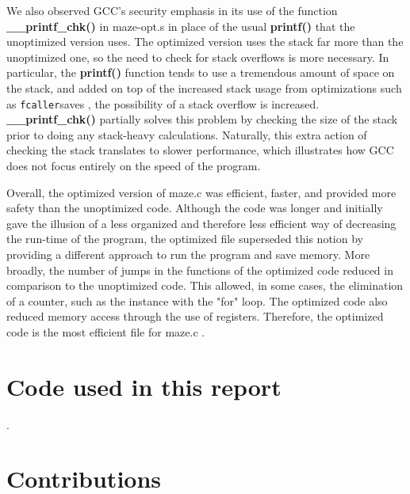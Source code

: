 \documentclass[12pt,letterpaper]{article}
\begin{document}
We also observed GCC’s security emphasis in its use of the function 
{\bf \_\_printf\_chk()} in maze-opt.s in place of the usual {\bf printf()} 
that the unoptimized version uses. The optimized version uses the 
stack far more than the unoptimized one, so the need to check for 
stack overflows is more necessary. In particular, the {\bf printf()} 
function tends to use a tremendous amount of space on the stack, and 
added on top of the increased stack usage from optimizations such as 
\verb -fcaller-saves , the possibility of a stack overflow is increased. 
{\bf \_\_printf\_chk()} partially solves this problem by  checking the size 
of the stack prior to doing any stack-heavy calculations. Naturally, 
this extra action of checking the stack translates to slower performance, 
which illustrates how GCC does not focus entirely on the speed of the program.

Overall, the optimized version of maze.c was efficient, faster, and provided 
more safety than the unoptimized code. Although the code was longer and 
initially gave the illusion of a less organized and therefore less efficient 
way of decreasing the run-time of the program, the optimized file superseded 
this notion by providing a different approach to run the program and save memory.
More broadly, the number of jumps in the functions of the optimized code reduced in comparison to the unoptimized code. This allowed, in some cases, the elimination of a counter, such as the instance with the "for" loop. The optimized code also reduced memory access through the use of registers. Therefore, the optimized code is the most efficient file for maze.c 
\appendix .
\appendixpage
\section{Code used in this report}

\appendix .
\section{Contributions}
\end{document}

